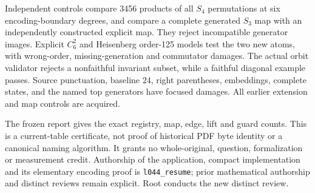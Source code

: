 \documentclass[11pt]{article}
\begin{document}
Independent controls compare 3456 products of all $S_4$ permutations at
six encoding-boundary degrees, and compare a complete generated $S_3$ map
with an independently constructed explicit map. They reject incompatible
generator images. Explicit $C_6^2$ and Heisenberg order-125 models test the
two new atoms, with wrong-order, missing-generation and commutator damages.
The actual orbit validator rejects a nonfaithful invariant subset, while
a faithful diagonal example passes. Source punctuation, baseline $24$,
right parentheses, embeddings, complete states, and the named top generators
have focused damages. All earlier extension and map controls are acquired.

The frozen report gives the exact registry, map, edge, lift and guard counts.
This is a current-table certificate, not proof of historical PDF byte
identity or a canonical naming algorithm. It grants no whole-original,
question, formalization or measurement credit. Authorship of the application,
compact implementation and its elementary encoding proof is
\texttt{l044\_resume}; prior mathematical authorship and distinct reviews
remain explicit. Root conducts the new distinct review.
\end{document}
